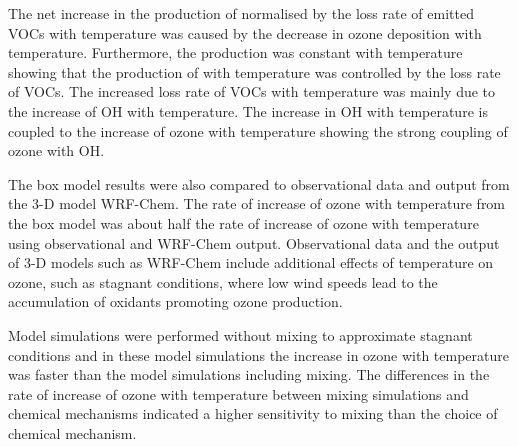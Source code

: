The net increase in the production of  normalised by the loss rate of emitted VOCs with temperature was caused by the decrease in ozone deposition with temperature.
Furthermore, the  production was constant with temperature showing that the production of  with temperature was controlled by the loss rate of VOCs.
The increased loss rate of VOCs with temperature was mainly due to the increase of OH with temperature. 
The increase in OH with temperature is coupled to the increase of ozone with temperature showing the strong coupling of ozone with OH.

The box model results were also compared to observational data and output from the 3-D model WRF-Chem.
The rate of increase of ozone with temperature from the box model was about half the rate of increase of ozone with temperature using observational and WRF-Chem output.
Observational data and the output of 3-D models such as WRF-Chem include additional effects of temperature on ozone, such as stagnant conditions, where low wind speeds lead to the accumulation of oxidants promoting ozone production.

Model simulations were performed without mixing to approximate stagnant conditions and in these model simulations the increase in ozone with temperature was faster than the model simulations including mixing.
The differences in the rate of increase of ozone with temperature between mixing simulations and chemical mechanisms indicated a higher sensitivity to mixing than the choice of chemical mechanism.
